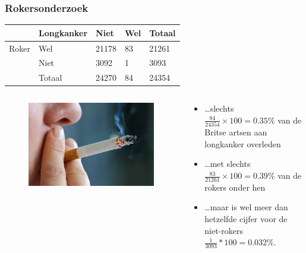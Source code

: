 \documentclass[aspectratio=169]{beamer}
\begin{document}
\begin{frame}
  \frametitle{Rokersonderzoek}
  \begin{table}[h]
\begin{tabular}{@{}lllll@{}}
\toprule
      & \textbf{Longkanker} & \textbf{Niet} & \textbf{Wel} & \textbf{Totaal} \\ \midrule
Roker & Wel                 & 21178         & 83           & 21261           \\
      & Niet                & 3092          & 1            & 3093            \\
      & Totaal              & 24270         & 84           & 24354           \\ \bottomrule
\end{tabular}
\end{table}

\begin{columns}
  \begin{column}{0.3 \textwidth}

  \begin{figure}
    \centering
      \includegraphics[width=1.00\textwidth]{img/les-6-smoking.jpg}
  \end{figure}

  \end{column}
  \begin{column}{0.7 \textwidth}

  \begin{itemize}
    \item \dots slechts $\frac{84}{ 24354} \times 100 = 0.35\% $ van de Britse artsen aan longkanker overleden
    \item \dots met slechts $\frac{83}{21261} \times 100 = 0.39\%$ van de rokers onder hen
    \item \dots maar  is wel  meer dan hetzelfde cijfer voor de niet-rokers $\frac{1}{3093} * 100 = 0.032\%$.
  \end{itemize}
  \end{column}
\end{columns}
\end{frame}
\end{document}
